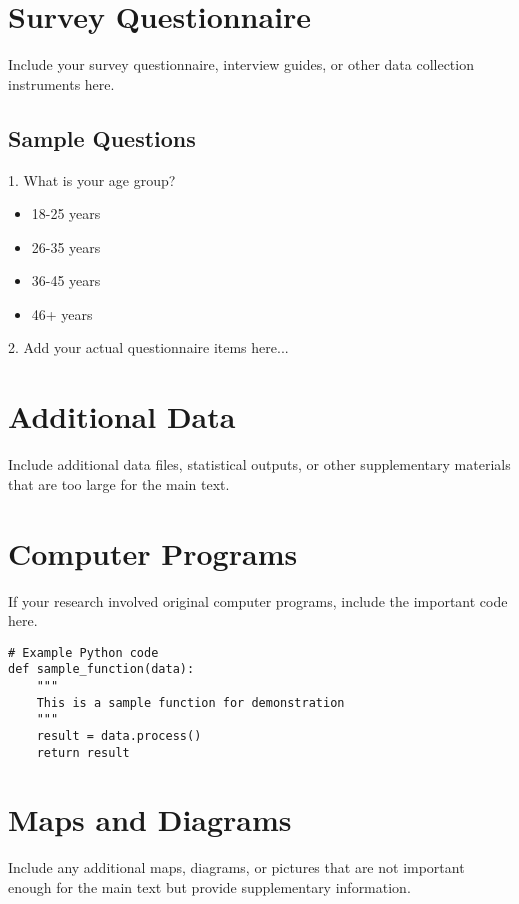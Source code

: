 \appendix
\chapter{Survey Questionnaire}
\label{app:survey}

Include your survey questionnaire, interview guides, or other data collection instruments here.

\section{Sample Questions}

1. What is your age group?
   \begin{itemize}
       \item 18-25 years
       \item 26-35 years
       \item 36-45 years
       \item 46+ years
   \end{itemize}

2. Add your actual questionnaire items here...

\chapter{Additional Data}
\label{app:data}

Include additional data files, statistical outputs, or other supplementary materials that are too large for the main text.

\chapter{Computer Programs}
\label{app:programs}

If your research involved original computer programs, include the important code here.

\begin{verbatim}
# Example Python code
def sample_function(data):
    """
    This is a sample function for demonstration
    """
    result = data.process()
    return result
\end{verbatim}

\chapter{Maps and Diagrams}
\label{app:maps}

Include any additional maps, diagrams, or pictures that are not important enough for the main text but provide supplementary information.
